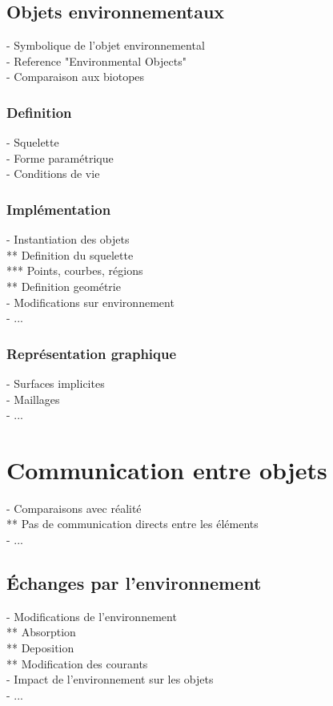 \subsection{Objets environnementaux}
- Symbolique de l'objet environnemental \\
- Reference "Environmental Objects" \\
- Comparaison aux biotopes

\subsubsection{Definition}
- Squelette \\
- Forme paramétrique \\
- Conditions de vie

\subsubsection{Implémentation}
- Instantiation des objets \\
** Definition du squelette \\
*** Points, courbes, régions \\
** Definition geométrie \\
- Modifications sur environnement \\
- ...

% 

\subsubsection{Représentation graphique}
- Surfaces implicites \\
- Maillages \\
- ...


\section{Communication entre objets}
- Comparaisons avec réalité \\
** Pas de communication directs entre les éléments \\
- ...

\subsection{Échanges par l'environnement}
- Modifications de l'environnement \\
** Absorption \\
** Deposition \\
** Modification des courants \\
- Impact de l'environnement sur les objets \\
- ...

